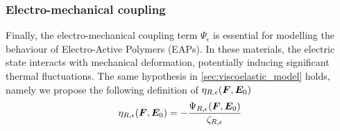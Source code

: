 %
%
%
%


\subsubsection{Electro-mechanical coupling} \label{sec:electro_mech_model}

Finally, the electro-mechanical coupling term $\Psi_{\epsilon}$ is essential for modelling the behaviour of Electro-Active Polymers (EAPs). In these materials, the electric state interacts with mechanical deformation, potentially inducing significant thermal fluctuations.
The same hypothesis in \ref{sec:viscoelastic_model} holds, namely we propose the following definition of $\eta_{R,\epsilon}(\boldsymbol{F},\boldsymbol{E}_0)$
%
\begin{equation}\label{eqn:etaR epsilon}
	\eta_{R,\epsilon}(\boldsymbol{F},\boldsymbol{E}_0)=-\frac{\Psi_{R,\epsilon}(\boldsymbol{F},\boldsymbol{E}_0)}{\zeta_{R,\epsilon}}
\end{equation}

